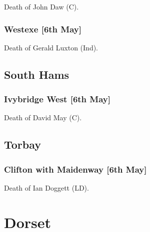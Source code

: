 \documentclass[a4paper,openany]{book}
\begin{document}
\begin{resultsiii}

Death of John Daw (C).

\subsubsection*{Westexe \hspace*{\fill}\nolinebreak[1]%
	\enspace\hspace*{\fill}
	[6th May]}


Death of Gerald Luxton (Ind).

\subsection*{South Hams}

\subsubsection*{Ivybridge West \hspace*{\fill}\nolinebreak[1]%
	\enspace\hspace*{\fill}
	[6th May]}


Death of David May (C).

\subsection*{Torbay}

\subsubsection*{Clifton with Maidenway \hspace*{\fill}\nolinebreak[1]%
	\enspace\hspace*{\fill}
	[6th May]}


Death of Ian Doggett (LD).

\section{Dorset}

\subsection*{}


\end{resultsiii}
\end{document}
